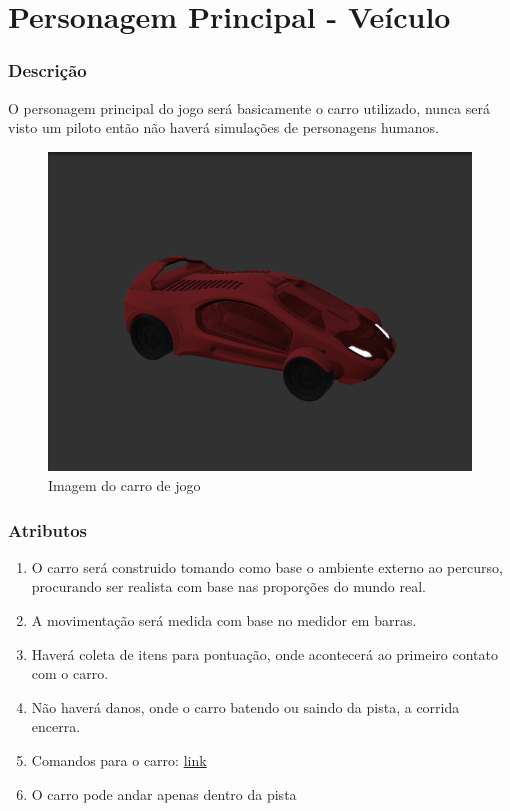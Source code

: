 \part{Personagem Principal - Veículo}

\section{Descrição}

	O personagem principal do jogo será basicamente o carro utilizado, nunca será visto um piloto então não haverá simulações de personagens humanos.

\begin{figure}[!h]
		\centering
	\includegraphics[scale=0.5]{figuras/carro}
		\caption{Imagem do carro de jogo}
\end{figure}
	
\section{Atributos}

	\begin{enumerate}
	
		\item O carro será construido tomando como base o ambiente externo ao percurso, procurando ser realista com base nas proporções do mundo real. 
		\item A movimentação será medida com base no medidor em barras.
		\item Haverá coleta de itens para pontuação, onde acontecerá ao primeiro contato com o carro.
		\item Não haverá danos, onde o carro batendo ou saindo da pista, a corrida encerra.
		\item Comandos para o carro: \hyperlink{teclas}{link}
		\item O carro pode andar apenas dentro da pista
	
	\end{enumerate}